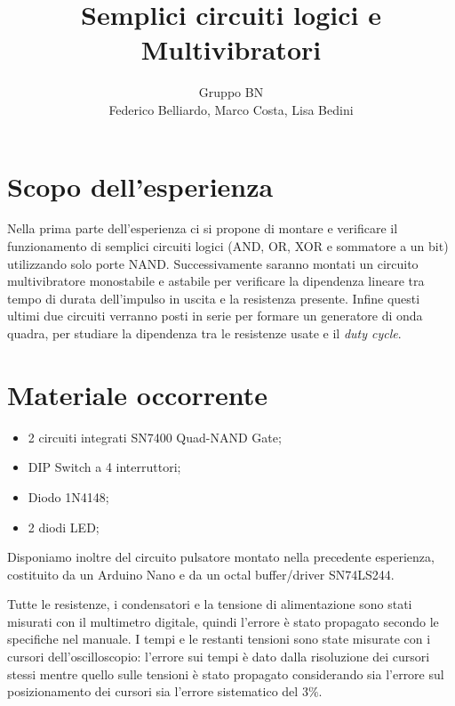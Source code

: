 \documentclass[10pt,a4paper]{article}
\author{Gruppo BN \\ Federico Belliardo, Marco Costa, Lisa Bedini}
\title{Semplici circuiti logici e Multivibratori}
\begin{document}
\maketitle
\section{Scopo dell'esperienza}
Nella prima parte dell'esperienza ci si propone di montare e verificare il funzionamento di semplici circuiti logici (AND, OR, XOR e sommatore a un bit) utilizzando solo porte NAND. Successivamente saranno montati un circuito multivibratore monostabile e astabile per verificare la dipendenza lineare tra tempo di durata dell'impulso in uscita e la resistenza presente. Infine questi ultimi due circuiti verranno posti in serie per formare un generatore di onda quadra, per studiare la dipendenza tra le resistenze usate e il \emph{duty cycle}.\\

\section{Materiale occorrente}
\begin{itemize}
\item 2 circuiti integrati SN7400 Quad-NAND Gate;
\item DIP Switch a 4 interruttori;
\item Diodo 1N4148;
\item 2 diodi LED;
\end{itemize}
Disponiamo inoltre del circuito pulsatore montato nella precedente esperienza, costituito da un Arduino Nano e da un octal buffer/driver SN74LS244.

Tutte le resistenze, i condensatori e la tensione di alimentazione sono stati misurati con il multimetro digitale, quindi l'errore è stato propagato secondo le specifiche nel manuale. I tempi e le restanti tensioni sono state misurate con i cursori dell'oscilloscopio: l'errore sui tempi è dato dalla risoluzione dei cursori stessi mentre quello sulle tensioni è stato propagato considerando sia l'errore sul posizionamento dei cursori sia l'errore sistematico del $3\%$.
\end{document}

